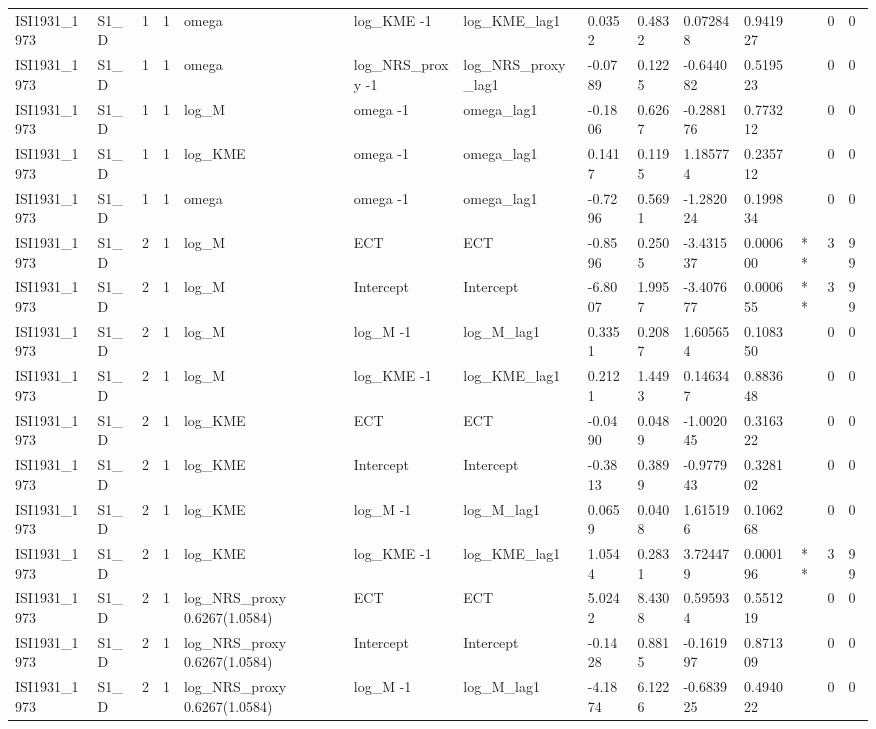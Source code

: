 \begin{tabular}{llllllllllllll}
ISI1931\_1973 & S1\_D & 1 & 1 & omega & log\_KME -1 & log\_KME\_lag1 & 0.0352 & 0.4832 & 0.072848 & 0.941927 &  & 0 & 0 \\
ISI1931\_1973 & S1\_D & 1 & 1 & omega & log\_NRS\_proxy -1 & log\_NRS\_proxy\_lag1 & -0.0789 & 0.1225 & -0.644082 & 0.519523 &  & 0 & 0 \\
ISI1931\_1973 & S1\_D & 1 & 1 & log\_M & omega -1 & omega\_lag1 & -0.1806 & 0.6267 & -0.288176 & 0.773212 &  & 0 & 0 \\
ISI1931\_1973 & S1\_D & 1 & 1 & log\_KME & omega -1 & omega\_lag1 & 0.1417 & 0.1195 & 1.185774 & 0.235712 &  & 0 & 0 \\
ISI1931\_1973 & S1\_D & 1 & 1 & omega & omega -1 & omega\_lag1 & -0.7296 & 0.5691 & -1.282024 & 0.199834 &  & 0 & 0 \\
ISI1931\_1973 & S1\_D & 2 & 1 & log\_M & ECT & ECT & -0.8596 & 0.2505 & -3.431537 & 0.000600 & ** & 3 & 99 \\
ISI1931\_1973 & S1\_D & 2 & 1 & log\_M & Intercept & Intercept & -6.8007 & 1.9957 & -3.407677 & 0.000655 & ** & 3 & 99 \\
ISI1931\_1973 & S1\_D & 2 & 1 & log\_M & log\_M -1 & log\_M\_lag1 & 0.3351 & 0.2087 & 1.605654 & 0.108350 &  & 0 & 0 \\
ISI1931\_1973 & S1\_D & 2 & 1 & log\_M & log\_KME -1 & log\_KME\_lag1 & 0.2121 & 1.4493 & 0.146347 & 0.883648 &  & 0 & 0 \\
ISI1931\_1973 & S1\_D & 2 & 1 & log\_KME & ECT & ECT & -0.0490 & 0.0489 & -1.002045 & 0.316322 &  & 0 & 0 \\
ISI1931\_1973 & S1\_D & 2 & 1 & log\_KME & Intercept & Intercept & -0.3813 & 0.3899 & -0.977943 & 0.328102 &  & 0 & 0 \\
ISI1931\_1973 & S1\_D & 2 & 1 & log\_KME & log\_M -1 & log\_M\_lag1 & 0.0659 & 0.0408 & 1.615196 & 0.106268 &  & 0 & 0 \\
ISI1931\_1973 & S1\_D & 2 & 1 & log\_KME & log\_KME -1 & log\_KME\_lag1 & 1.0544 & 0.2831 & 3.724479 & 0.000196 & ** & 3 & 99 \\
ISI1931\_1973 & S1\_D & 2 & 1 & log\_NRS\_proxy 0.6267(1.0584) & ECT & ECT & 5.0242 & 8.4308 & 0.595934 & 0.551219 &  & 0 & 0 \\
ISI1931\_1973 & S1\_D & 2 & 1 & log\_NRS\_proxy 0.6267(1.0584) & Intercept & Intercept & -0.1428 & 0.8815 & -0.161997 & 0.871309 &  & 0 & 0 \\
ISI1931\_1973 & S1\_D & 2 & 1 & log\_NRS\_proxy 0.6267(1.0584) & log\_M -1 & log\_M\_lag1 & -4.1874 & 6.1226 & -0.683925 & 0.494022 &  & 0 & 0 \\

\end{tabular}
